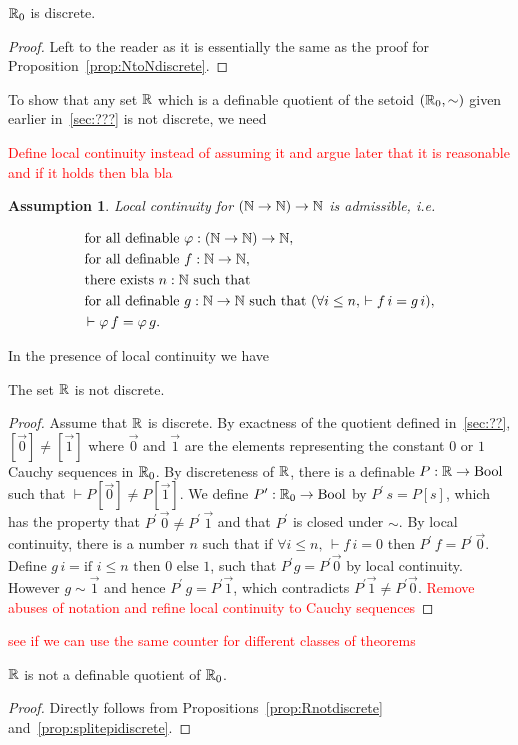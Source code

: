 \documentclass{llncs}
\newtheorem{assumption}{Assumption}%
\newcommand{\bocks}[1]{[#1]}
\newcommand{\todo}[1]{\textcolor{red}{#1}}
\begin{document}
\begin{proposition}
 $\mathbb{R}_0$ is discrete.
\end{proposition}
\begin{proof}
Left to the reader as it is essentially the same as the proof for Proposition~\ref{prop:NtoNdiscrete}.
\end{proof}
To show that any set $\mathbb{R}$ which is a definable quotient of the setoid $(\mathbb{R}_0,\sim)$ given earlier in~\ref{sec:???} is not discrete, we need

\todo{Define local continuity instead of assuming it and argue later that it is reasonable and if it holds then bla bla}
\begin{assumption}
Local continuity  for $({\mathbb N} \to {\mathbb N}) \to {\mathbb N}$ is admissible, i.e.

\newcommand{\fad}{\text{for all definable }}
\begin{align*}
   &\fad \varphi : (\N \to \N) \to \N,\\
   &\fad f : \N \to \N,\\
   &\text{there exists }  n:\N\text{ such that }\\
   &\fad g : \N \to \N \text{ such that } (\forall i\leq n,\, \vdash f\,i = g\,i),\\
   &{\,\vdash \varphi\, f} = \varphi\, g.
\end{align*}
\end{assumption}

In the presence of local continuity we have 
\begin{proposition}\label{prop:Rnotdiscrete} The set $\mathbb{R}$ is not discrete.
\end{proposition}
\begin{proof}
Assume that $\mathbb{R}$ is discrete. By exactness of the quotient defined in~\ref{sec:??}, $\bocks{\vec 0} \neq \bocks{\vec 1}$ where $\vec 0$ and $\vec 1$ are the elements representing the constant $0$ or $1$ Cauchy sequences in $\mathbb{R}_0$. By discreteness of $\mathbb{R}$, there is a definable $P:\mathbb{R}\to\mathrm{Bool}$ 
such that $\vdash P\bocks{\vec 0}\neq P\bocks{\vec 1 }$. We define $P^\prime:\mathbb{R}_0\to\mathrm{Bool}$ by $P^\prime\,s = P\bocks{s}$, which has the property that $P^\prime\,\vec0\neq P^\prime\,\vec 1$ and that $P^\prime$ is closed under $\sim$. By local continuity, there is a number $n$  such that if $\forall i\leq n,\, \vdash f\,i = 0$ then $P^\prime \, f = P^\prime\,\vec 0$. Define $g\,i=\text{if } i\leq n \text{ then } 0 \text{ else } 1$, such that $P^\prime g =P^\prime \vec 0$ by local continuity. However $g \sim \vec 1$ and hence $P^\prime\,g=P^\prime \vec 1$, which contradicts $P^\prime \vec 1 \neq P^\prime \vec 0$. 
\todo{Remove abuses of notation and refine local continuity to Cauchy sequences}
\end{proof}

\todo{see if we can use the same counter for different classes of theorems}
\begin{corollary}
$\mathbb{R}$ is not a definable quotient of $\mathbb{R}_0$.
\end{corollary}
\begin{proof}
Directly follows from Propositions~\ref{prop:Rnotdiscrete} and~\ref{prop:splitepidiscrete}.
\end{proof}
\end{document}
